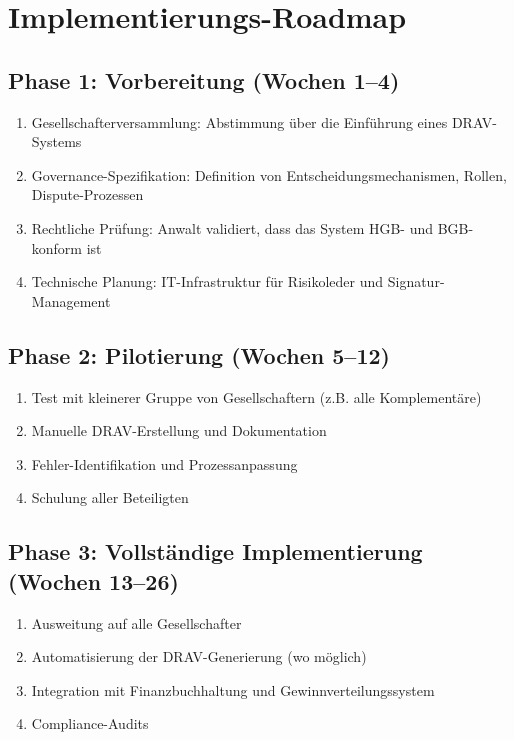 \documentclass[a4paper,12pt]{article}
\theoremstyle{definition}
\begin{document}
\section{Implementierungs-Roadmap}

\subsection{Phase 1: Vorbereitung (Wochen 1--4)}

\begin{enumerate}
    \item Gesellschafterversammlung: Abstimmung über die Einführung eines DRAV-Systems
    \item Governance-Spezifikation: Definition von Entscheidungsmechanismen, Rollen, Dispute-Prozessen
    \item Rechtliche Prüfung: Anwalt validiert, dass das System HGB- und BGB-konform ist
    \item Technische Planung: IT-Infrastruktur für Risikoleder und Signatur-Management
\end{enumerate}

\subsection{Phase 2: Pilotierung (Wochen 5--12)}

\begin{enumerate}
    \item Test mit kleinerer Gruppe von Gesellschaftern (z.B. alle Komplementäre)
    \item Manuelle DRAV-Erstellung und Dokumentation
    \item Fehler-Identifikation und Prozessanpassung
    \item Schulung aller Beteiligten
\end{enumerate}

\subsection{Phase 3: Vollständige Implementierung (Wochen 13--26)}

\begin{enumerate}
    \item Ausweitung auf alle Gesellschafter
    \item Automatisierung der DRAV-Generierung (wo möglich)
    \item Integration mit Finanzbuchhaltung und Gewinnverteilungssystem
    \item Compliance-Audits
\end{enumerate}
\end{document}
